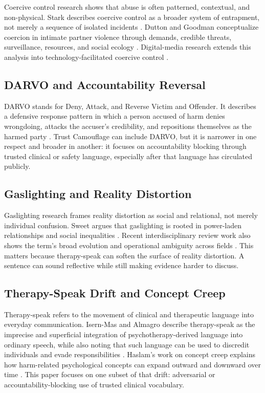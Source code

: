 \documentclass[11pt, letterpaper]{article}
\begin{document}
Coercive control research shows that abuse is often patterned, contextual, and non-physical. Stark describes coercive control as a broader system of entrapment, not merely a sequence of isolated incidents \cite{Stark2007}. Dutton and Goodman conceptualize coercion in intimate partner violence through demands, credible threats, surveillance, resources, and social ecology \cite{DuttonGoodman2005}. Digital-media research extends this analysis into technology-facilitated coercive control \cite{Dragiewicz2018}.

\subsection{DARVO and Accountability Reversal}

DARVO stands for Deny, Attack, and Reverse Victim and Offender. It describes a defensive response pattern in which a person accused of harm denies wrongdoing, attacks the accuser's credibility, and repositions themselves as the harmed party \cite{Harsey2017,Harsey2024}. Trust Camouflage can include DARVO, but it is narrower in one respect and broader in another: it focuses on accountability blocking through trusted clinical or safety language, especially after that language has circulated publicly.

\subsection{Gaslighting and Reality Distortion}

Gaslighting research frames reality distortion as social and relational, not merely individual confusion. Sweet argues that gaslighting is rooted in power-laden relationships and social inequalities \cite{Sweet2019}. Recent interdisciplinary review work also shows the term's broad evolution and operational ambiguity across fields \cite{Darke2025}. This matters because therapy-speak can soften the surface of reality distortion. A sentence can sound reflective while still making evidence harder to discuss.

\subsection{Therapy-Speak Drift and Concept Creep}

Therapy-speak refers to the movement of clinical and therapeutic language into everyday communication. Isern-Mas and Almagro describe therapy-speak as the imprecise and superficial integration of psychotherapy-derived language into ordinary speech, while also noting that such language can be used to discredit individuals and evade responsibilities \cite{IsernMas2025}. Haslam's work on concept creep explains how harm-related psychological concepts can expand outward and downward over time \cite{Haslam2016}. This paper focuses on one subset of that drift: adversarial or accountability-blocking use of trusted clinical vocabulary.
\end{document}
